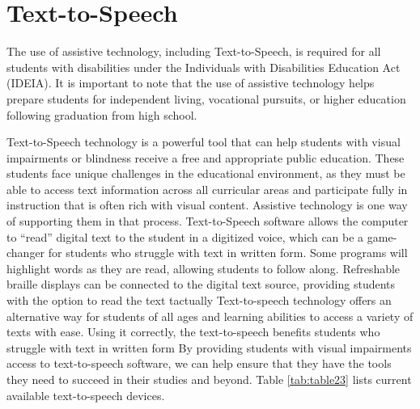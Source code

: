 \documentclass[14pt,letterpaper,twoside]{extreport}
\begin{document}
\pagebreak \hypertarget{text-to-speech}{}\section{Text-to-Speech}\label{text-to-speech}
The use of assistive technology, including Text-to-Speech, is required for all students with disabilities under the Individuals with Disabilities Education Act (IDEIA). It is important to note that the use of assistive technology helps prepare students for independent living, vocational pursuits, or higher education following graduation from high school. 

Text-to-Speech technology is a powerful tool that can help students with visual impairments or blindness receive a free and appropriate public education. These students face unique challenges in the educational environment, as they must be able to access text information across all curricular areas and participate fully in instruction that is often rich with visual content. Assistive technology is one way of supporting them in that process. Text-to-Speech software allows the computer to “read” digital text to the student in a digitized voice, which can be a game-changer for students who struggle with text in written form. Some programs will highlight words as they are read, allowing students to follow along. Refreshable braille displays can be connected to the digital text source, providing students with the option to read the text tactually Text-to-speech technology offers an alternative way for students of all ages and learning abilities to access a variety of texts with ease. Using it correctly, the text-to-speech benefits students who struggle with text in written form By providing students with visual impairments access to text-to-speech software, we can help ensure that they have the tools they need to succeed in their studies and beyond. Table \ref{tab:table23} lists current available text-to-speech devices.
\end{document}
